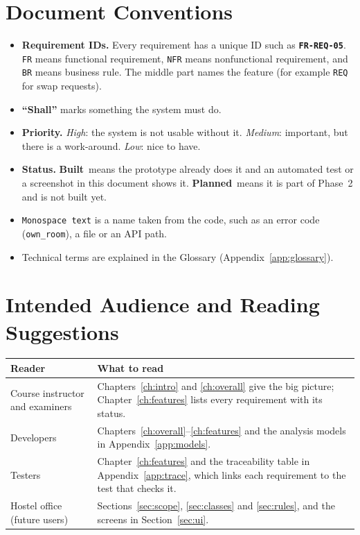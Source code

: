\documentclass[11pt,a4paper,parskip=half,toc=listof]{scrreprt}
\newcommand{\Built}{\textcolor{builtgreen}{\textbf{Built}}}
\newcommand{\Planned}{\textcolor{plannedamber}{\textbf{Planned}}}
\newcommand{\Req}[1]{\textbf{\texttt{#1}}}
\begin{document}
\section{Document Conventions}

\begin{itemize}
  \item \textbf{Requirement IDs.} Every requirement has a unique ID such as
    \Req{FR-REQ-05}. \texttt{FR} means functional requirement, \texttt{NFR}
    means nonfunctional requirement, and \texttt{BR} means business rule.
    The middle part names the feature (for example \texttt{REQ} for swap
    requests).
  \item \textbf{``Shall''} marks something the system must do.
  \item \textbf{Priority.} \emph{High}: the system is not usable without it.
    \emph{Medium}: important, but there is a work-around. \emph{Low}: nice
    to have.
  \item \textbf{Status.} \Built\ means the prototype already does it and an
    automated test or a screenshot in this document shows it.
    \Planned\ means it is part of Phase~2 and is not built yet.
  \item \texttt{Monospace text} is a name taken from the code, such as an
    error code (\texttt{own\_room}), a file or an API path.
  \item Technical terms are explained in the Glossary
    (Appendix~\ref{app:glossary}).
\end{itemize}

\section{Intended Audience and Reading Suggestions}

\begin{xltabular}{\linewidth}{@{}L{3.6cm}Y@{}}
  \toprule
  \textbf{Reader} & \textbf{What to read}\\
  \midrule
  \endhead
  Course instructor and examiners & Chapters~\ref{ch:intro} and
    \ref{ch:overall} give the big picture; Chapter~\ref{ch:features} lists
    every requirement with its status.\\
  Developers & Chapters~\ref{ch:overall}--\ref{ch:features} and the
    analysis models in Appendix~\ref{app:models}.\\
  Testers & Chapter~\ref{ch:features} and the traceability table in
    Appendix~\ref{app:trace}, which links each requirement to the test
    that checks it.\\
  Hostel office (future users) & Sections~\ref{sec:scope},
    \ref{sec:classes} and \ref{sec:rules}, and the screens in
    Section~\ref{sec:ui}.\\
  \bottomrule
\end{xltabular}
\end{document}
